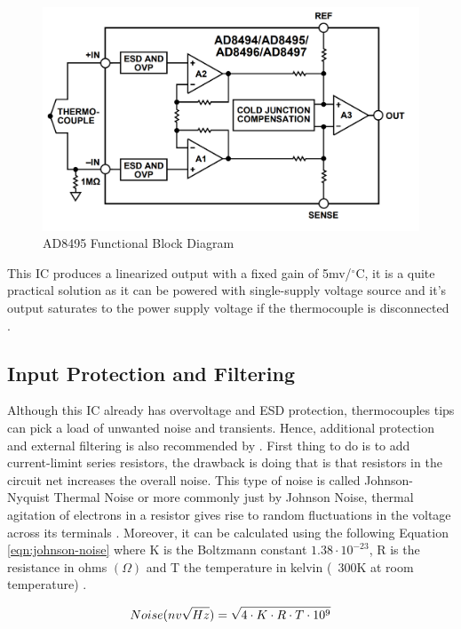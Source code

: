 			\begin{figure}[htbp]
				\centering
					\includegraphics[width=.8\textwidth]{figuras/fig-ad8495-functional-block}
				\caption{AD8495 Functional Block Diagram \cite{ad8495-functional-block}}
				\label{fig:ad8495-functional-block}
			\end{figure}
			
		This IC produces a linearized output with a fixed gain of 5mv/$^{\circ}$C, it is a quite practical solution as it can be powered with single-supply voltage source and it's output saturates to the power supply voltage if the thermocouple is disconnected \cite{ad8495-datasheet}.

	\subsection{Input Protection and Filtering}\label{ssec:ad8495InputProtectionAndFiltering}
	
	Although this IC already has overvoltage and ESD protection, thermocouples tips can pick a load of unwanted noise and transients. Hence, additional protection and external filtering is also recommended by \cite{two-ways-thermocouple}. First thing to do is to add current-limint series resistors, the drawback is doing that is that resistors in the circuit net increases the overall noise. This type of noise is called Johnson-Nyquist Thermal Noise or more commonly just by Johnson Noise, thermal agitation of electrons in a resistor gives rise to random fluctuations in the voltage across its terminals \cite{romero1998johnson}. Moreover, it can be calculated using the following Equation \ref{eqn:johnson-noise} where K is the Boltzmann constant $1.38 \cdot 10^{-23}$, R is the resistance in ohms $(\Omega)$ and T the temperature in kelvin (~300K at room temperature) \cite{sensors2000}.
	
		\begin{equation}\label{eqn:johnson-noise}
			Noise (nv\/\sqrt{Hz}) = \sqrt{4 \cdot K \cdot R \cdot T \cdot 10^{9}}
		\end{equation}
		
